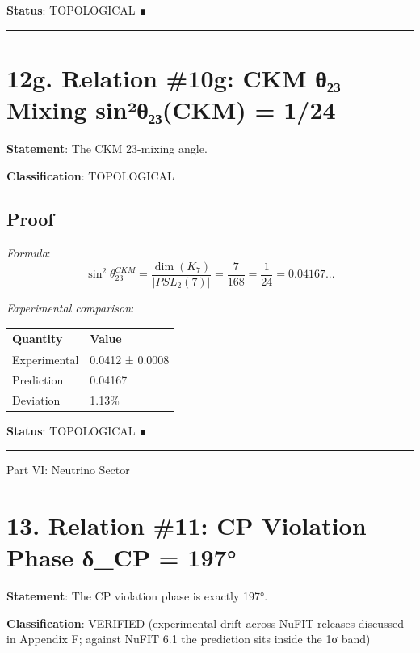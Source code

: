 \documentclass[11pt,a4paper]{article}
\begin{document}
\textbf{Status}: TOPOLOGICAL ∎

\begin{center}\rule{\linewidth}{0.5pt}\end{center}

\section{12g. Relation \#10g: CKM θ₂₃ Mixing sin²θ₂₃(CKM) = 1/24}\label{g.-relation-10g-ckm-ux3b8ux2082ux2083-mixing-sinuxb2ux3b8ux2082ux2083ckm-124}

\textbf{Statement}: The CKM 23-mixing angle.

\textbf{Classification}: TOPOLOGICAL

\subsection{Proof}\label{proof-14}

\emph{Formula}: \[\sin^2\theta_{23}^{CKM} = \frac{\dim(K_7)}{|PSL_2(7)|} = \frac{7}{168} = \frac{1}{24} = 0.04167...\]

\emph{Experimental comparison}:

\begin{longtable}[]{@{}ll@{}}
\toprule\noalign{}
Quantity & Value \\
\midrule\noalign{}
\endhead
\bottomrule\noalign{}
\endlastfoot
Experimental & 0.0412 ± 0.0008 \\
Prediction & 0.04167 \\
Deviation & 1.13\% \\
\end{longtable}

\textbf{Status}: TOPOLOGICAL ∎

\begin{center}\rule{\linewidth}{0.5pt}\end{center}

Part VI: Neutrino Sector

\section{13. Relation \#11: CP Violation Phase δ\_\allowbreak{}CP = 197°}\label{relation-11-cp-violation-phase-ux3b4_cp-197}

\textbf{Statement}: The CP violation phase is exactly 197°.

\textbf{Classification}: VERIFIED (experimental drift across NuFIT releases discussed in Appendix F; against NuFIT 6.1 the prediction sits inside the 1σ band)
\end{document}
